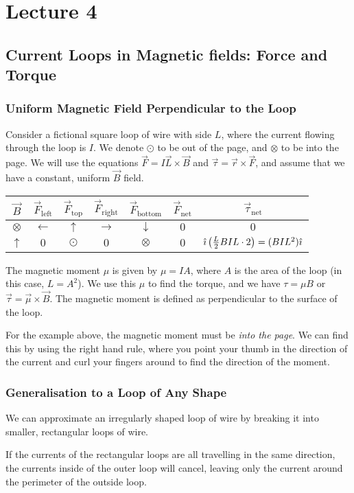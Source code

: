 \documentclass[class=article, crop=false]{standalone}
\begin{document}
  \section{Lecture 4}
  \subsection{Current Loops in Magnetic fields: Force and Torque}
  \subsubsection{Uniform Magnetic Field Perpendicular to the Loop}
  Consider a fictional square loop of wire with side $L$, where the current flowing through the loop is $I$. We denote $\odot$ to be out of the page, and $\otimes$ to be into the page. We will use the equations $\vec{F} = I\vec{L}\times \vec{B}$ and $\vec{\tau}=\vec{r}\times \vec{F}$, and assume that we have a constant, uniform $\vec{B}$ field.
  \begin{center}\end{center}
  \begin{center}\begin{tabular}{c|c|c|c|c|c|c}
    $\vec{B}$ & $\vec{F}_\text{left}$ & $\vec{F}_\text{top}$ & $\vec{F}_\text{right}$ & $\vec{F}_\text{bottom}$ & $\vec{F}_\text{net}$ & $\vec{\tau}_\text{net}$ \\
    \hline
    $\otimes$ & $\leftarrow$ & $\uparrow$ & $\rightarrow$ & $\downarrow$ & $0$ & $0$ \\
    $\uparrow$ & $0$ & $\odot$ & $0$ & $\otimes$ & $0$ & $\hat{\imath}\left( \frac{L}{2}BIL\cdot 2 \right) = (BIL^2)\hat{\imath}$
  \end{tabular}\end{center}
  The magnetic moment $\mu$ is given by $\mu = IA$, where $A$ is the area of the loop (in this case, $L = A^2$). We use this $\mu$ to find the torque, and we have $\tau = \mu B$ or $\vec{\tau} = \vec{\mu}\times \vec{B}$. The magnetic moment is defined as perpendicular to the surface of the loop. \par
  For the example above, the magnetic moment must be \emph{into the page}. We can find this by using the right hand rule, where you point your thumb in the direction of the current and curl your fingers around to find the direction of the moment.
  \subsubsection{Generalisation to a Loop of Any Shape}
  We can approximate an irregularly shaped loop of wire by breaking it into smaller, rectangular loops of wire. 
  \begin{note}{}
    If the currents of the rectangular loops are all travelling in the same direction, the currents inside of the outer loop will cancel, leaving only the current around the perimeter of the outside loop.
  \end{note}
\end{document}
